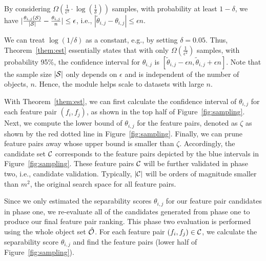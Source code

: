 \begin{theorem}\label{them:est}
By considering $\Omega(\frac{1}{\epsilon^2}\cdot \log(\frac{1}{\delta}))$ samples, with probability at least $1-\delta$, we have $|\frac{\theta_{i,j}({\mathcal{S}})}{|{\mathcal{S}}|}-\frac{\theta_{i,j}}{n}| \leq \epsilon$, i.e., $|\tilde{\theta}_{i,j}-\theta_{i,j}|\leq \epsilon n$.
\end{theorem}
\noindent We can treat $\log(1/\delta)$ as a constant, e.g., by setting $\delta = 0.05$. Thus, Theorem~\ref{them:est} essentially states that with only $\Omega(\frac{1}{\epsilon^2})$ samples, with probability 95\%, the confidence interval for $\theta_{i,j}$ is $[\tilde{\theta}_{i,j}-\epsilon n, \tilde{\theta}_{i,j}+\epsilon n]$. Note that the sample size $|{\mathcal{S}}|$ only depends on $\epsilon$ and is independent of the number of objects, $n$. Hence, the \sampling module helps \genviz scale to datasets with large $n$.

With Theorem~\ref{them:est}, we can first calculate the confidence interval of $\theta_{i,j}$ for each feature pair $(f_i,f_j)$, as shown in the top half of Figure~\ref{fig:sampling}. Next, we compute the lower bound of $\theta_{i,j}$ for the \topk feature pairs, denoted as $\zeta$ as shown by the red dotted line in Figure~\ref{fig:sampling}. Finally, we can prune feature pairs away whose upper bound is smaller than $\zeta$. Accordingly, the candidate set ${\mathcal{C}}$ corresponds to the feature pairs depicted by the blue intervals in Figure~\ref{fig:sampling}. These feature pairs ${\mathcal{C}}$ will be further validated in phase two, i.e., candidate validation. Typically, $|{\mathcal{C}}|$ will be orders of magnitude smaller than $m^2$, the original search space for all feature pairs.

Since we only estimated the separability scores $\theta_{i,j}$ for our feature pair candidates in phase one, we re-evaluate all of the candidates generated from phase one to produce our final feature pair ranking. This phase two evaluation is performed using the whole object set $\hat{{\mathcal{O}}}$.
 For each feature pair $(f_i,f_j)\in {\mathcal{C}}$, we calculate the separability score $\theta_{i,j}$ and find the \topk feature pairs (lower half of Figure~\ref{fig:sampling}).

